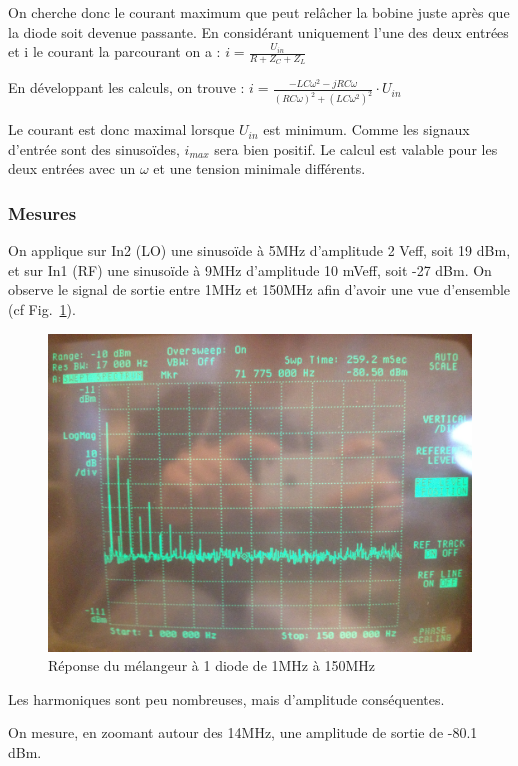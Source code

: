 \documentclass{article}
\begin{document}
On cherche donc le courant maximum que peut relâcher la bobine juste après que la diode soit devenue passante.
En considérant uniquement l'une des deux entrées et i le courant la parcourant on a :
$i=\frac{U_{in}}{R+Z_{C}+Z_{L}}$

En développant les calculs, on trouve : $i=\frac{-LC\omega^{2}-jRC\omega}{(RC\omega)^{2}+(LC\omega^{2})^{2}}\cdot U_{in}$

Le courant est donc maximal lorsque $U_{in}$ est minimum. Comme les signaux d'entrée sont des sinusoïdes, $i_{max}$ sera bien positif.
Le calcul est valable pour les deux entrées avec un $\omega$ et une tension minimale différents.

\subsubsection{Mesures}


On applique sur In2 (LO) une sinusoïde à 5MHz d'amplitude 2 Veff, soit 19 dBm, et sur In1 (RF) une sinusoïde à 9MHz d'amplitude 10 mVeff, soit -27 dBm.
On observe le signal de sortie entre 1MHz et 150MHz afin d'avoir une vue d'ensemble (cf Fig.~\ref{fig:11_3_1}).

\begin{figure}[h!]
	\centering
	\includegraphics[width=.7\textwidth]{11_3_1}
	\caption{Réponse du mélangeur à 1 diode de 1MHz à 150MHz}
	\label{fig:11_3_1}
\end{figure}

Les harmoniques sont peu nombreuses, mais d'amplitude conséquentes. %


On mesure, en zoomant autour des 14MHz, une amplitude de sortie de -80.1 dBm.
\end{document}
